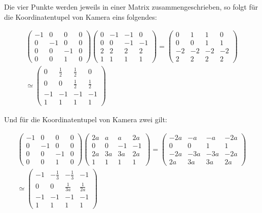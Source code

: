 Die vier Punkte werden jeweils in einer Matrix zusammengeschrieben, so folgt für die Koordinatentupel von Kamera eins folgendes:

\begin{gather}
	\begin{pmatrix}
		-1&0&0&0\\
		0&-1&0&0\\
		0&0&-1&0\\
		0&0&1&0
	\end{pmatrix}
	\begin{pmatrix}
		0&-1&-1&0\\
		0&0&-1&-1\\
		2&2&2&2\\
		1&1&1&1
	\end{pmatrix}=
	\begin{pmatrix}
		0&1&1&0\\
		0&0&1&1\\
		-2&-2&-2&-2\\
		2&2&2&2
	\end{pmatrix}\\
	\simeq
	\begin{pmatrix}
		0&\frac{1}{2}&\frac{1}{2}&0\\
		0&0&\frac{1}{2}&\frac{1}{2}\\
		-1&-1&-1&-1\\
		1&1&1&1
	\end{pmatrix}
\end{gather}
\pagebreak

Und für die Koordinatentupel von Kamera zwei gilt:

\begin{gather}
	\begin{pmatrix}
		-1&0&0&0\\
		0&-1&0&0\\
		0&0&-1&0\\
		0&0&1&0
	\end{pmatrix}
	\begin{pmatrix}
		2a&a&a&2a\\
		0&0&-1&-1\\
		2a&3a&3a&2a\\
		1&1&1&1
	\end{pmatrix}=
	\begin{pmatrix}
		-2a&-a&-a&-2a\\
		0&0&1&1\\
		-2a&-3a&-3a&-2a\\
		2a&3a&3a&2a
	\end{pmatrix}\\
	\simeq
	\begin{pmatrix}
		-1&-\frac{1}{3}&-\frac{1}{3}&-1\\
		0&0&\frac{1}{3a}&\frac{1}{2a}\\
		-1&-1&-1&-1\\
		1&1&1&1
	\end{pmatrix}
\end{gather}\\

